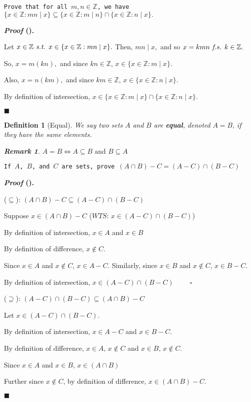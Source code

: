\documentclass[12pt,a4paper]{article}
\newtheorem{df}{Definition}[subsection]
\newcounter{nprf}[subsection]
\newtheorem*{rmk}{\indent Remark}
\newenvironment*{prf}{\par\indent\textbf{\textit{Proof} (\stepcounter{nprf}\thenprf). }\par }{\par\hfill $\blacksquare$\par}
\def\Z{{\mathbb{Z}}}
\def\st{\emph{ s.t. }}
\def\fs{\emph{ f.s. }}
\def\WTS{\mathit{WTS}}
\begin{document}
\begin{framed}
\noindent\texttt{Prove that for all $m,n\in\Z$, we have $\{x\in\Z: mn\mid x\}\subseteq\{x\in\Z:m\mid n\}\cap\{x\in\Z:n\mid x\}.$}	
\begin{prf}
	Let $x\in\Z\st x\in\{x\in\Z: mn\mid x\}.$ Then, $mn\mid x,$ and so $x=kmn\fs k\in\Z.$\par So, $x=m(kn),$ and since $kn\in\Z$, $x\in\{x\in\Z:m\mid x\}$.\par Also, $x=n(km),$ and since $km\in\Z$, $x\in\{x\in\Z:n\mid x\}$.\par By definition of intersection, $x\in\{x\in\Z:m\mid x\}\cap\{x\in\Z:n\mid x\}$.
\end{prf}
\end{framed}
\begin{df}[Equal]
	We say two sets $A$ and $B$ are \textbf{equal}, denoted $A=B$, if they have the same elements.
	\begin{rmk}
		$A=B\iff A\subseteq B\text{ and }B\subseteq A$	
	\end{rmk}
\end{df}
\begin{framed}
\noindent\texttt{If $A$, $B$, and $C$ are sets, prove $(A\cap B)-C=(A-C)\cap(B-C)$}
\begin{prf}
	($\subseteq$): $(A\cap B)-C\subseteq(A-C)\cap(B-C)$\par\hspace{5mm}Suppose $x\in(A\cap B)-C$ ($\WTS$: $x\in(A-C)\cap(B-C)$)\par\hspace{5mm}By definition of intersection, $x\in A$ and $x\in B$\par\hspace{5mm}By definition of difference, $x\notin C.$\par\hspace{5mm}Since $x\in A$ and $x\notin C$, $x\in A-C$. Similarly, since $x\in B$ and $x\notin C$, $x\in B-C$.\par\hspace{5mm}By definition of intersection, $x\in(A-C)\cap(B-C)$ $\qquad\square$\par
	($\supseteq$): $(A-C)\cap(B-C)\subseteq(A\cap B)-C$\par\hspace{5mm}Let $x\in(A-C)\cap(B-C)$.\par\hspace{5mm}By definition of intersection, $x\in A-C$ and $x\in B-C$.\par\hspace{5mm}By definition of difference, $x\in A$, $x\notin C$ and $x\in B$, $x\notin C$.\par\hspace{5mm}Since $x\in A$ and $x\in B$, $x\in(A\cap B)$\par\hspace{5mm}Further since $x\notin C$, by definition of difference, $x\in(A\cap B)-C.$
\end{prf}
\end{framed}
\end{document}
